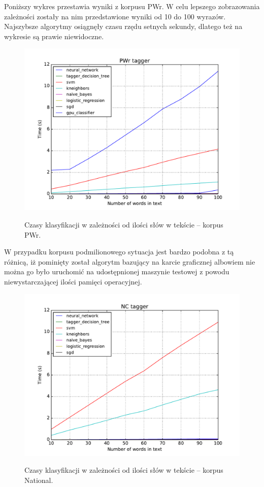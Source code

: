 Poniższy wykres przestawia wyniki z korpusu PWr. W celu lepszego zobrazowania zależności zostały na nim przedstawione wyniki od 10 do 100 wyrazów. Najszybsze algorytmy osiągnęły czasu rzędu setnych sekundy, dlatego też na wykresie są prawie niewidoczne.

\begin{figure}[H]
	\centering
	\includegraphics[width=\linewidth]{charts/czasy_pwr.pdf}
	\label{Rysunek}
	\caption{Czasy klasyfikacji w zależności od ilości słów w tekście -- korpus PWr.}
\end{figure}

\newpage

W przypadku korpusu podmilionowego sytuacja jest bardzo podobna z tą różnicą, iż pominięty został algorytm bazujący na karcie graficznej albowiem nie można go było uruchomić na udostępnionej maszynie testowej z powodu niewystarczającej ilości pamięci operacyjnej.

\begin{figure}[H]
	\centering
	\includegraphics[width=\linewidth]{charts/czasy_nc.pdf}
	\label{Rysunek}
	\caption{Czasy klasyfikacji w zależności od ilości słów w tekście -- korpus National.}
\end{figure}
